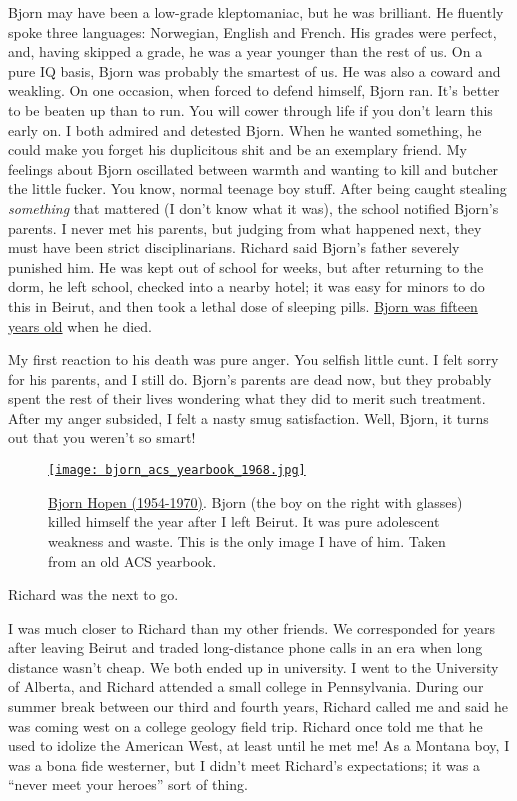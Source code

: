 Bjorn may have been a low-grade kleptomaniac, but he was brilliant. He
fluently spoke three languages: Norwegian, English and French. His
grades were perfect, and, having skipped a grade, he was a year younger
than the rest of us. On a pure IQ basis, Bjorn was probably the smartest
of us. He was also a coward and weakling. On one occasion, when forced
to defend himself, Bjorn ran. It's better to be beaten up than to run.
You will cower through life if you don't learn this early on. I both
admired and detested Bjorn. When he wanted something, he could make you
forget his duplicitous shit and be an exemplary friend. My feelings
about Bjorn oscillated between warmth and wanting to kill and butcher
the little fucker. You know, normal teenage boy stuff. After being
caught stealing \emph{something} that mattered (I don't know what it
was), the school notified Bjorn's parents. I never met his parents, but
judging from what happened next, they must have been strict
disciplinarians. Richard said Bjorn's father severely punished him. He
was kept out of school for weeks, but after returning to the dorm, he
left school, checked into a nearby hotel; it was easy for minors to do
this in Beirut, and then took a lethal dose of sleeping pills.
\href{https://www.findagrave.com/memorial/244135118/bjorn_erik-hopen/flower}{Bjorn
was fifteen years old} when he died.

My first reaction to his death was pure anger. You selfish little cunt.
I felt sorry for his parents, and I still do. Bjorn's parents are dead
now, but they probably spent the rest of their lives wondering what they
did to merit such treatment. After my anger subsided, I felt a nasty
smug satisfaction. Well, Bjorn, it turns out that you weren't so smart!

\captionsetup[figure]{labelformat=empty}
\begin{SCfigure}
\centering
\href{https://conceptcontrol.smugmug.com/Places/Overseas/Beirut-Lebanon-1960s-1/i-xRLzQPh/A}{\texttt{[image: bjorn\_acs\_yearbook\_1968.jpg]}}
\caption[Bjorn Hopen (1954-1970)]{\href{https://www.findagrave.com/memorial/244135118/bjorn_erik-hopen/flower}{Bjorn Hopen (1954-1970)}. Bjorn (the boy on the right with glasses) killed himself the year after I left Beirut.
It was pure adolescent weakness and waste. This is the only image I have
of him. Taken from an old ACS yearbook.}
\label{fig:8196x0}
\end{SCfigure}

Richard was the next to go.

I was much closer to Richard than my other friends. We corresponded for
years after leaving Beirut and traded long-distance phone calls in an
era when long distance wasn't cheap. We both ended up in university. I
went to the University of Alberta, and Richard attended a small college
in Pennsylvania. During our summer break between our third and fourth
years, Richard called me and said he was coming west on a college
geology field trip. Richard once told me that he used to idolize the
American West, at least until he met me! As a Montana boy, I was a bona
fide westerner, but I didn't meet Richard's expectations; it was a
``never meet your heroes'' sort of thing.

